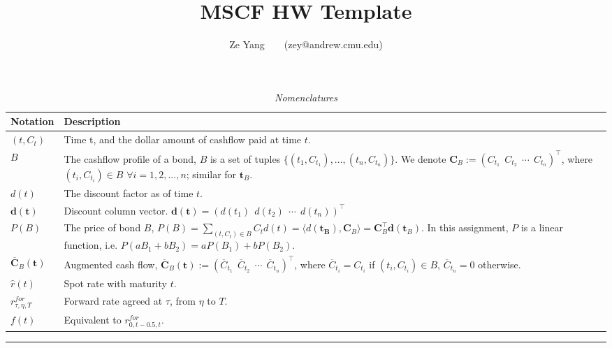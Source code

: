 \documentclass[a4paper, 10pt]{article}
\title{\textbf{MSCF HW Template}}
\author{Ze Yang~~~~(zey@andrew.cmu.edu)}
\renewcommand{\arraystretch}{1.4}
\theoremstyle{definition}
\theoremstyle{hSol}
\begin{document}
\maketitle

\begin{table}[h]
\vspace{-10pt}
\caption{\textit{Nomenclatures}}
\vspace{3pt}
\centering
\def\arraystretch{1.15}
\begin{tabular}{lL}
\hline
Notation & \hspace{4.6cm} Description \\ 
\hline
$(t, C_t)$ & Time t, and the dollar amount of cashflow paid at time $t$. \\
$B$ & The cashflow profile of a bond, $B$ is a set of tuples $\{(t_1, C_{t_1}), ..., (t_n, C_{t_n})\}$. We denote $\bm{C}_{B} := (C_{t_1}~~C_{t_2}~~\cdots~~C_{t_n})^{\top}$, where $(t_i, C_{t_i}) \in B$ $\forall i = 1,2,...,n$; similar for $\bm{t}_B$.\\
$d(t)$ & The discount factor as of time $t$.\\
$\bm{d}(\bm{t})$ & Discount column vector. $\bm{d}(\bm{t}) = (d(t_1) ~~ d(t_2) ~~\cdots~~ d(t_n))^{\top}$ \\
$P(B)$ & The price of bond $B$, $P(B)=\sum_{(t,C_t) \in B}C_td(t)=\langle d(\bm{t_B}), \bm{C}_B \rangle = \bm{C}_B^{\top}\bm{d}(\bm{t}_B)$. In this assignment, $P$ is a linear function, i.e. $P(aB_1+bB_2) = aP(B_1)+bP(B_2).$\\
$\overline{\bm{C}}_{B}(\bm{t})$ & Augmented cash flow,  $\overline{\bm{C}}_{B}(\bm{t}) := (\overline{C}_{t_1}~~\overline{C}_{t_2}~~\cdots~~\overline{C}_{t_n})^{\top}$, where $\overline{C}_{t_i} = C_{t_i}$ if $(t_i, C_{t_i}) \in B$, $\overline{C}_{t_n}=0$ otherwise.\\
$\hat{r}(t)$ & Spot rate with maturity $t$.\\
$r^{for}_{\tau, \eta, T}$ & Forward rate agreed at $\tau$, from $\eta$ to $T$.\\
$f(t)$ & Equivalent to $r^{for}_{0, t-0.5, t}$. \\
\hline 
\end{tabular}
\label{tab:Nomen}
\end{table}

\noindent\rule{16cm}{0.4pt}
\end{document}
